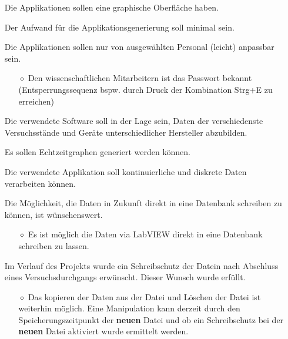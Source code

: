 \begin{enumerate}[leftmargin = 1.5em, label = \textbullet , itemsep = 0.1em]
\item[\cmark] Die Applikationen sollen eine graphische Oberfläche haben.
\item[\cmark] Der Aufwand für die Applikationsgenerierung soll minimal sein.
\item[\cmark] Die Applikationen sollen nur von ausgewählten Personal (\glqq leicht\grqq{}) anpassbar sein.

\begin{enumerate}[leftmargin = 1.5em, label = \textbullet , itemsep = 0.1em]
\item[$\diamond$] Den wissenschaftlichen Mitarbeitern ist das Passwort bekannt (Entsperrungssequenz bspw. durch Druck der Kombination Strg+E zu erreichen)
\end{enumerate}

\item[\cmark] Die verwendete Software soll in der Lage sein, Daten der verschiedenste Versuchsstände und Geräte unterschiedlicher Hersteller abzubilden.
\item[\cmark] Es sollen Echtzeitgraphen generiert werden können.
\item[\cmark] Die verwendete Applikation soll kontinuierliche und diskrete Daten verarbeiten können.
\item[\cmark] Die Möglichkeit, die Daten in Zukunft direkt in eine Datenbank schreiben zu können, ist wünschenswert.

\begin{enumerate}[leftmargin = 1.5em, label = \textbullet , itemsep = 0.1em]
\item[$\diamond$] Es ist möglich die Daten via LabVIEW direkt in eine Datenbank schreiben zu lassen.
\end{enumerate}

\item[\textcolor{OliveGreen}{\cmark}] Im Verlauf des Projekts wurde ein Schreibschutz der Datein nach Abschluss  eines Versuchsdurchgangs erwünscht. Dieser Wunsch wurde erfüllt. 

\begin{enumerate}[leftmargin = 1.5em, label = \textbullet , itemsep = 0.1em]
\item[$\diamond$] Das kopieren der Daten aus der Datei und Löschen der Datei ist weiterhin möglich. Eine Manipulation kann derzeit durch den Speicherungszeitpunkt der \textbf{neuen} Datei und ob ein Schreibschutz bei der \textbf{neuen} Datei aktiviert wurde ermittelt werden.
\end{enumerate}
\end{enumerate}

